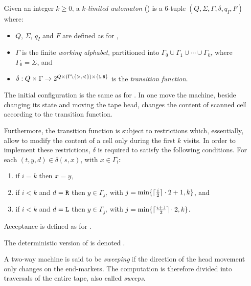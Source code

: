 \begin{defn}\label{def:kla}
	Given an integer $k\ge0$, a \emph{$k$-limited automaton} (\kLA) is a 6-tuple $(Q,\Sigma,\Gamma,\delta,q_I,F)$ where:
	\begin{itemize}
		\item $Q$, $\Sigma$, $q_I$ and $F$ are defined as for \TNFAs,
		\item $\Gamma$ is the finite \emph{working alphabet}, partitioned into $\Gamma_0\cup\Gamma_1\cup\cdots\cup\Gamma_k$, where $\Gamma_0=\Sigma$, and
		\item $\delta:Q\times\Gamma\to2^{Q\times(\Gamma\setminus\{\rhd,\lhd\})\times\{\mathtt L,\mathtt R\}}$ is the \emph{transition function}.
	\end{itemize}
	The initial configuration is the same as for \TNFAs.
	In one move the machine, beside changing its state and moving the tape head, changes the content of scanned cell according to the transition function.

	Furthermore, the transition function is subject to restrictions which, essentially, allow to modify the content of a cell only during the first $k$ visits.
	In order to implement these restrictions, $\delta$ is required to satisfy the following conditions. For each $(t,y,d)\in\delta(s,x)$, with $x\in\Gamma_i$:
	\begin{enumerate}[(1)]
		\item if $i=k$ then $x=y$,
		\item if $i<k$ and $d=\mathtt R$ then $y\in\Gamma_j$, with $j=\min\{\lceil \frac{i}{2} \rceil\cdot 2+1,k\}$, and
		\item if $i<k$ and $d=\mathtt L$ then $y\in\Gamma_j$, with $j=\min\{\lceil \frac{i+1}{2} \rceil\cdot 2,k\}$.
	\end{enumerate}

	\noindent Acceptance is defined as for \TNFAs.

	\noindent The deterministic version of \kLA is denoted \kDLA.
\end{defn}


\begin{defn}\label{def:sweeping}
	A two-way machine is said to be \emph{sweeping} if the direction of the head movement only changes on the end-markers.
	The computation is therefore divided into traversals of the entire tape, also called \emph{sweeps}.
\end{defn}

